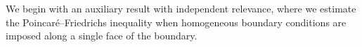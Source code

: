 \documentclass[10pt,letterpaper]{article}
\begin{document}






















We begin with an auxiliary result with independent relevance, where we estimate the Poincar\'e--Friedrichs inequality when homogeneous boundary conditions are imposed along a single face of the boundary. 
\end{document}
